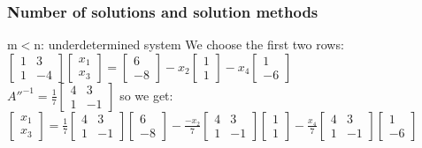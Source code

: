 \begin{frame}
	\frametitle{Number of solutions and solution methods}
	\begin{block}{m$<$n: underdetermined system}
		We choose the first two rows:\\
		$\begin{bmatrix}
		1 & 3\\
		1 & -4
		\end{bmatrix} \begin{bmatrix}
		x_1\\x_3
		\end{bmatrix}=\begin{bmatrix}
		6\\-8
		\end{bmatrix}-x_2\begin{bmatrix}
		1\\1
		\end{bmatrix}-x_4\begin{bmatrix}
		1\\-6
		\end{bmatrix}$\\
		$A''^{-1}=\frac{1}{7}\begin{bmatrix}
		4 & 3\\1 & -1
		\end{bmatrix}$ so we get:\\
		$\begin{bmatrix}
		x_1\\x_3
		\end{bmatrix}=\frac{1}{7}\begin{bmatrix}
		4 & 3\\1 & -1
		\end{bmatrix} \begin{bmatrix}
		6\\-8 \end{bmatrix}-\frac{-x_2}{7}\begin{bmatrix}
		4 & 3\\ 1 & -1 
		\end{bmatrix} \begin{bmatrix}
		1\\1
		\end{bmatrix} - \frac{x_4}{7}\begin{bmatrix}
		4 & 3\\ 1 & -1
		\end{bmatrix} \begin{bmatrix}
		1\\-6
		\end{bmatrix}$\\

\end{block}
\end{frame}
